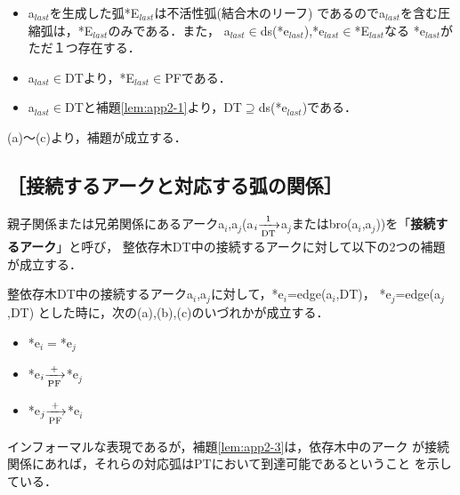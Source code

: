 \begin{lemma}[対応弧の存在]
{\begin{itemize}
\item[(a)]a$_{last}$を生成した弧*E$_{last}$は不活性弧(結合木のリーフ)
であるのでa$_{last}$を含む圧縮弧は，*E$_{last}$のみである．また，
a$_{last}{\in}$ds(*e$_{last}$),*e$_{last}{\in}$*E$_{last}$なる
*e$_{last}$がただ１つ存在する．
\item[(b)]a$_{last}{\in}$DTより，*E$_{last}{\in}$PFである．
\item[(c)]a$_{last}{\in}$DTと補題\ref{lem:app2-1}より，DT${\supseteq}$ds(*e$_{last}$)である．
\end{itemize}

{\mynoindent}(a)〜(c)より，補題が成立する．
}

\end{lemma}


\subsection*{［接続するアークと対応する弧の関係］}

親子関係または兄弟関係にあるアークa$_i$,a$_j$(a$_i{\xrightarrow[{\rm
DT}]{1}}$a$_j$またはbro(a$_i$,a$_j$))を「{\bf 接続するアーク}」と呼び，
整依存木DT中の接続するアークに対して以下の2つの補題が成立する．

\begin{lemma}[接続するアークと対応する弧]
\label{lem:app2-3}

整依存木DT中の接続するアークa$_i$,a$_j$に対して，*e$_i$=edge(a$_i$,DT)，
*e$_j$=edge(a$_j$,DT) とした時に，次の(a),(b),(c)のいづれかが成立する．
\begin{itemize}
\item[(a)]*e$_i=$*e$_j$
\item[(b)]*e$_i{\xrightarrow[{\rm PF}]{+}}$*e$_j$
\item[(c)]*e$_j{\xrightarrow[{\rm PF}]{+}}$*e$_i$
\end{itemize}

インフォーマルな表現であるが，補題\ref{lem:app2-3}は，依存木中のアーク
が接続関係にあれば，それらの対応弧はPTにおいて到達可能であるということ
を示している．

\end{lemma}

